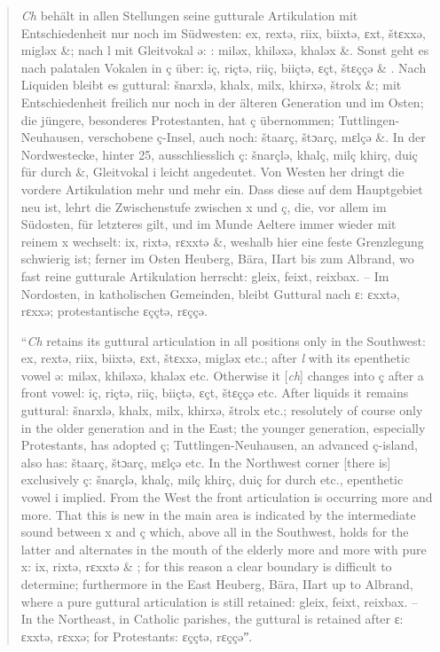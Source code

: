 \begin{quote}
\textit{Ch} behält in allen Stellungen seine gutturale Artikulation mit Entschiedenheit nur noch im Südwesten: ex, rextə, riix, biixtə, ɛxt, štɛxxə, migləx \&; nach l mit Gleitvokal ə: : miləx, khiləxə, khaləx \&. Sonst geht es nach palatalen Vokalen in ç über: iç, riçtə, riiç, biiçtə, ɛçt, štɛççə \& . Nach Liquiden bleibt es guttural: šnarxlə, khalx, milx, khirxə, štrolx \&; mit Entschiedenheit freilich nur noch in der älteren Generation und im Osten; die jüngere, besonderes Protestanten, hat ç übernommen; Tuttlingen-Neuhausen, verschobene ç-Insel, auch noch: štaarç, štɔarç, mɛlçə \&. In der Nordwestecke, hinter 25, ausschliesslich ç: šnarçlə, khalç, milç khirç, duiç für durch \&, Gleitvokal i leicht angedeutet. Von Westen her dringt die vordere Artikulation mehr und mehr ein. Dass diese auf dem Hauptgebiet neu ist, lehrt die Zwischenstufe zwischen x und ç, die, vor allem im Südosten, für letzteres gilt, und im Munde Aeltere immer wieder mit reinem x wechselt: ix, rixtə, rɛxxtə \&, weshalb hier eine feste Grenzlegung schwierig ist; ferner im Osten Heuberg, Bära, IIart bis zum Albrand, wo fast reine gutturale Artikulation herrscht: gleix, feixt, reixbax. -- Im Nordosten, in katholischen Gemeinden, bleibt Guttural nach ɛ: ɛxxtə, rɛxxə; protestantische ɛççtə, rɛççə.

“\textit{Ch} retains its guttural articulation in all positions only in the Southwest: ex, rextə, riix, biixtə, ɛxt, štɛxxə, migləx etc.; after \textit{l} with its epenthetic vowel ə: miləx, khiləxə, khaləx etc.  Otherwise it [\textit{ch}] changes into ç after a front vowel: iç, riçtə, riiç, biiçtə, ɛçt, štɛççə etc. After liquids it remains guttural: šnarxlə, khalx, milx, khirxə, štrolx etc.; resolutely of course only in the older generation and in the East; the younger generation, especially Protestants, has adopted ç; Tuttlingen-Neuhausen, an advanced ç-island, also has: štaarç, štɔarç, mɛlçə etc.  In the Northwest corner [there is] exclusively ç: šnarçlə, khalç, milç khirç, duiç for durch etc., epenthetic vowel i implied. From the West the front articulation is occurring more and more. That this is new in the main area is indicated by the intermediate sound between x and ç which, above all in the Southwest, holds for the latter and alternates in the mouth of the elderly more and more with pure x: ix, rixtə, rɛxxtə \& ; for this reason a clear boundary is difficult to determine; furthermore in the East Heuberg, Bära, IIart up to Albrand, where a pure guttural articulation is still retained: gleix, feixt, reixbax. -- In the Northeast, in Catholic parishes, the guttural is retained after ɛ: ɛxxtə, rɛxxə; for Protestants: ɛççtə, rɛççəˮ.
\end{quote}

